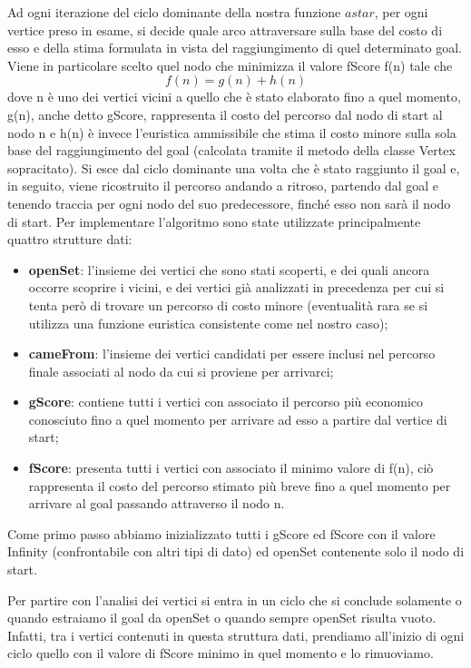 \documentclass[12pt,a4paper]{report}
\begin{document}
Ad ogni iterazione del ciclo dominante della nostra funzione \(astar\), per ogni vertice preso in esame, si decide quale arco attraversare sulla base del costo di esso e della stima formulata in vista del raggiungimento di quel determinato goal.
Viene in particolare scelto quel nodo che minimizza il valore fScore f(n) tale che\[f(n) = g(n) + h(n)\]dove n è uno dei vertici vicini a quello che è stato elaborato fino a quel momento, g(n), anche detto gScore, rappresenta il costo del percorso dal nodo di start al nodo n e h(n) è invece l'euristica ammissibile che stima il costo minore sulla sola base del raggiungimento del goal (calcolata tramite il metodo della classe Vertex sopracitato). Si esce dal ciclo dominante una volta che è stato raggiunto il goal e, in seguito, viene ricostruito il percorso andando a ritroso, partendo dal goal e tenendo traccia per ogni nodo del suo predecessore, finché esso non sarà il nodo di start. 
\newpage
Per implementare l'algoritmo sono state utilizzate principalmente quattro strutture dati:
\begin{itemize}
	\item \textbf{openSet}: l'insieme dei vertici che sono stati scoperti, e dei quali ancora occorre scoprire i vicini, e dei vertici già analizzati in precedenza per cui si tenta però di trovare un percorso di costo minore (eventualità rara se si utilizza una funzione euristica consistente come nel nostro caso); %
	\item \textbf{cameFrom}: l'insieme dei vertici candidati per essere inclusi nel percorso finale associati al nodo da cui si proviene per arrivarci;
	\item \textbf{gScore}: contiene tutti i vertici con associato il percorso più economico conosciuto fino a quel momento per arrivare ad esso a partire dal vertice di start;
	\item \textbf{fScore}:  presenta tutti i vertici con associato il minimo valore di f(n), ciò rappresenta il costo del percorso stimato più breve fino a quel momento per arrivare al goal passando attraverso il nodo n. 
\end{itemize}

Come primo passo abbiamo inizializzato tutti i gScore ed fScore con il valore Infinity (confrontabile con altri tipi di dato) ed openSet contenente solo il nodo di start.

Per partire con l'analisi dei vertici si entra in un ciclo che si conclude solamente o quando estraiamo il goal da openSet o quando sempre openSet risulta vuoto. Infatti, tra i vertici contenuti in questa struttura dati, prendiamo all'inizio di ogni ciclo quello con il valore di fScore minimo in quel momento e lo rimuoviamo.
\end{document}
